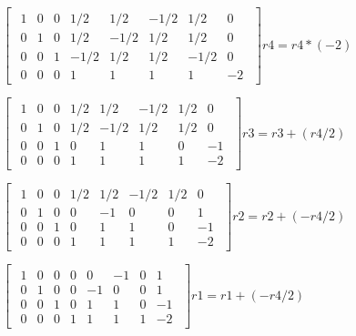 \singlespacing

\begin{math}
    \begin{bmatrix}
        \begin{array}{cccc|cccc}
            1 & 0 & 0 & 1/2  & 1/2  & -1/2 & 1/2  & 0  \\
            0 & 1 & 0 & 1/2  & -1/2 & 1/2  & 1/2  & 0  \\
            0 & 0 & 1 & -1/2 & 1/2  & 1/2  & -1/2 & 0  \\
            0 & 0 & 0 & 1    & 1    & 1    & 1    & -2
        \end{array}
    \end{bmatrix}
    r4 = r4 * (-2)
\end{math}

\singlespacing

\begin{math}
    \begin{bmatrix}
        \begin{array}{cccc|cccc}
            1 & 0 & 0 & 1/2 & 1/2  & -1/2 & 1/2 & 0  \\
            0 & 1 & 0 & 1/2 & -1/2 & 1/2  & 1/2 & 0  \\
            0 & 0 & 1 & 0   & 1    & 1    & 0   & -1 \\
            0 & 0 & 0 & 1   & 1    & 1    & 1   & -2
        \end{array}
    \end{bmatrix}
    r3 = r3 + (r4/2)
\end{math}

\singlespacing

\begin{math}
    \begin{bmatrix}
        \begin{array}{cccc|cccc}
            1 & 0 & 0 & 1/2 & 1/2 & -1/2 & 1/2 & 0  \\
            0 & 1 & 0 & 0   & -1  & 0    & 0   & 1  \\
            0 & 0 & 1 & 0   & 1   & 1    & 0   & -1 \\
            0 & 0 & 0 & 1   & 1   & 1    & 1   & -2
        \end{array}
    \end{bmatrix}
    r2 = r2 + (-r4/2)
\end{math}

\singlespacing

\begin{math}
    \begin{bmatrix}
        \begin{array}{cccc|cccc}
            1 & 0 & 0 & 0 & 0  & -1 & 0 & 1  \\
            0 & 1 & 0 & 0 & -1 & 0  & 0 & 1  \\
            0 & 0 & 1 & 0 & 1  & 1  & 0 & -1 \\
            0 & 0 & 0 & 1 & 1  & 1  & 1 & -2
        \end{array}
    \end{bmatrix}
    r1 = r1 + (-r4/2)
\end{math}


